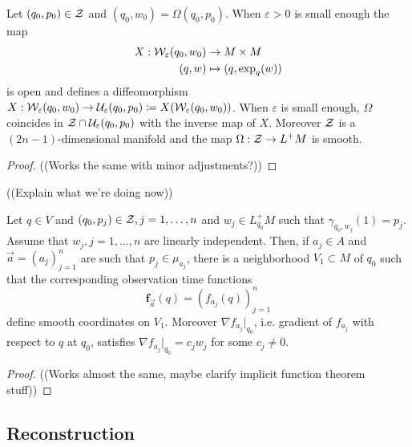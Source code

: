\begin{lemma}
Let $(q_0,p_0)\in \mathcal{Z}$ and $(q_0,w_0)=\Omega(q_0,p_0)$. When $\varepsilon>0$ is small enough the map 
\begin{align*}
    X:\mathcal{W}_\varepsilon(q_0,w_0) &\to M\times M\\
    (q,w) &\mapsto (q,\exp_q(w))
\end{align*}
is open and defines a diffeomorphism $X:\mathcal{W}_\varepsilon(q_0,w_0)\to \mathcal{U}_\varepsilon(q_0,p_0) \coloneqq X(\mathcal{W}_\varepsilon(q_0,w_0))$. When $\varepsilon$ is small enough, $\Omega$ coincides in $\mathcal{Z}\cap \mathcal{U}_\varepsilon(q_0,p_0)$ with the inverse map of $X$. Moreover $\mathcal{Z}$ is a $(2n-1)$-dimensional manifold and the map $\Omega:\mathcal{Z}\to L^+M$ is smooth.
\end{lemma}
\begin{proof}
((Works the same with minor adjustments?))
\end{proof}

((Explain what we're doing now))

\begin{proposition}\label{prop:observationtimecoordinates}
Let $q\in V$ and $(q_0,p_j)\in \mathcal{Z}, j=1,\dots, n$ and $w_j\in L^+_{q_0}M$ such that $\gamma_{q_0,w_j}(1) = p_j$. Assume that $w_j, j=1,\dots, n$ are linearly independent. Then, if $a_j\in A$ and $\overrightarrow{a} = (a_j)^n_{j=1}$ are such that $p_j\in \mu_{a_j}$, there is a neighborhood $V_1\subset M$ of $q_0$ such that the corresponding observation time functions 
\[
\mathbf{f}_{\overrightarrow{a}}(q) = (f_{a_j}(q))^n_{j=1}
\]
define smooth coordinates on $V_1$. Moreover $\nabla f_{a_j}\rvert_{q_0}$, i.e. gradient of $f_{a_j}$ with respect to $q$ at $q_0$, satisfies $\nabla f_{a_j}\rvert_{q_0} = c_jw_j$ for some $c_j\neq 0$.
\end{proposition}
\begin{proof}
((Works almost the same, maybe clarify implicit function theorem stuff))
\end{proof}

\subsection{Reconstruction}

